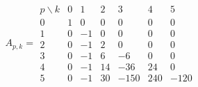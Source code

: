 \documentclass[a4paper,10pt]{amsart}
\theoremstyle{plain}{
    \newtheorem{theorem}{Theorem}[section]
    \newtheorem{lemma}[theorem]{Lemma}
    \newtheorem{corollary}[theorem]{Corollary}
    \newtheorem{proposition}[theorem]{Proposition}
    \newtheorem{conjecture}[theorem]{Conjecture}
}
\theoremstyle{definition}{
    \newtheorem{definition}[theorem]{Definition}
    \newtheorem{defn-thm}[theorem]{Definition-Theorem}
    \newtheorem{example}[theorem]{Example}
    \newtheorem{notation}[theorem]{Notation}
}
\theoremstyle{remark}{
    \newtheorem{remark}[theorem]{Remark}
    \newtheorem{problem}[theorem]{Problem}
    \newtheorem{question}[theorem]{Question}
}
\def\N{\mathbb{N}}
\begin{document}
\begin{equation}
 \label{eq:some values of Apk}
A_{p,k}=\begin{array}{c|rrrrrr}
p\backslash k & 0 & 1 & 2 & 3 & 4 & 5\\\hline
0 & 1 & 0 & 0 & 0 & 0 & 0\\
1 & 0 & -1 & 0 & 0 & 0 & 0\\
2 & 0 & -1 & 2 & 0 & 0 & 0\\
3 & 0 & -1 & 6 & -6 & 0 & 0\\
4 & 0 & -1 & 14 & -36 & 24 & 0\\
5 & 0 & -1 & 30 & -150 & 240 & -120
\end{array}
\end{equation}

 
%
 
\end{document}
